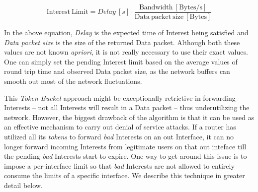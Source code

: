 \begin{equation}
\mathrm{Interest\ Limit} = Delay\ [s] \cdot \frac{\mathrm{Bandwidth\ [Bytes/s]}}{\mathrm{Data\ packet\ size\ [Bytes]}}
\end{equation}

In the above equation, \emph{Delay} is the expected time of Interest being satisfied and \emph{Data packet size} is the size of the returned Data packet.
Although both these values are not known {\it apriori}, it is not really necessary to use their exact values.
One can simply set the pending Interest limit based on the average values of round trip time and observed Data packet size, as the network buffers can smooth out most of the network fluctuations.

This {\it Token Bucket} approach might be exceptionally retrictive in forwarding Interests -- not all Interests will result in a Data packet -- thus underutilizing the network. However, the biggest drawback of the algorithm is that it can be used as an effective mechanism to carry out denial of service attacks. If a router has utilized all its {\it tokens} to forward {\it bad} Interests on an out Interface, it can no longer forward incoming Interests from legitimate users on that out inteface till the pending {\it bad} Interests start to expire. One way to get around this issue is to impose a per-interface limit so that {\it bad} Interests are not allowed to entirely consume the limits of a specific interface. We describe this technique in greater detail below.

%
%
%

